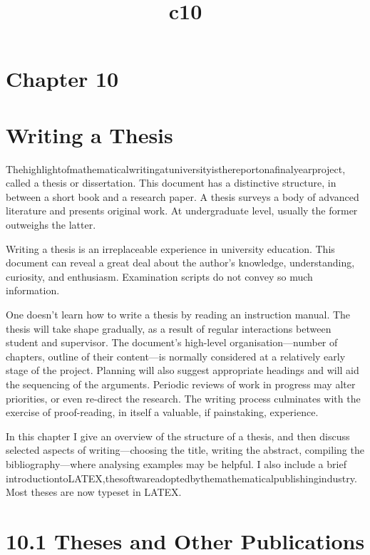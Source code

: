 \documentclass[11pt]{article}
\title{c10}
\date{}
\theoremstyle{plain}
\theoremstyle{definition}
\begin{document}
\maketitle

\section{Chapter 10}

\section{Writing a Thesis}

Thehighlightofmathematicalwritingatuniversityisthereportonafinalyearproject, called a thesis or dissertation. This document has a distinctive structure, in between a short book and a research paper. A thesis surveys a body of advanced literature and presents original work. At undergraduate level, usually the former outweighs the latter.

Writing a thesis is an irreplaceable experience in university education. This document can reveal a great deal about the author's knowledge, understanding, curiosity, and enthusiasm. Examination scripts do not convey so much information.

One doesn't learn how to write a thesis by reading an instruction manual. The thesis will take shape gradually, as a result of regular interactions between student and supervisor. The document's high-level organisation---number of chapters, outline of their content---is normally considered at a relatively early stage of the project. Planning will also suggest appropriate headings and will aid the sequencing of the arguments. Periodic reviews of work in progress may alter priorities, or even re-direct the research. The writing process culminates with the exercise of proof-reading, in itself a valuable, if painstaking, experience.

In this chapter I give an overview of the structure of a thesis, and then discuss selected aspects of writing---choosing the title, writing the abstract, compiling the bibliography---where analysing examples may be helpful. I also include a brief introductiontoLATEX,thesoftwareadoptedbythemathematicalpublishingindustry.Most theses are now typeset in LATEX.

\section{10.1 Theses and Other Publications}
\end{document}
